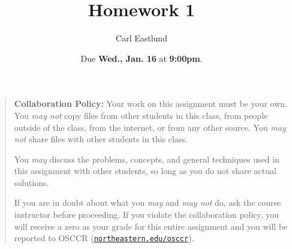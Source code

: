 \documentclass{article}
\title{Homework 1}
\author{Carl Eastlund}
\date{Due \textbf{Wed., Jan. 16} at \textbf{9:00pm}.}
\begin{document}
\maketitle

\newcommand\link[2][http://]{\href{#1#2}{\nolinkurl{#2}}}
\newcommand\http[1]{\link[http://]{#1}}
\newcommand\https[1]{\link[https://]{#1}}
\newcommand\email[1]{\link[mailto:]{#1}}

\begin{quotation}

  \noindent \textbf{Collaboration Policy:} Your work on this assignment must be
  your own.  You \emph{may not} copy files from other students in this class,
  from people outside of the class, from the internet, or from any other source.
  You \emph{may not} share files with other students in this class.

  \medskip

  \noindent You \emph{may} discuss the problems, concepts, and general
  techniques used in this assignment with other students, so long as you do not
  share actual solutions.

  \medskip

  \noindent If you are in doubt about what you \emph{may} and \emph{may not} do,
  ask the course instructor before proceeding.  If you violate the collaboration
  policy, you will receive a zero as your grade for this entire assignment and
  you will be reported to OSCCR (\link{northeastern.edu/osccr}).

\end{quotation}
\end{document}
